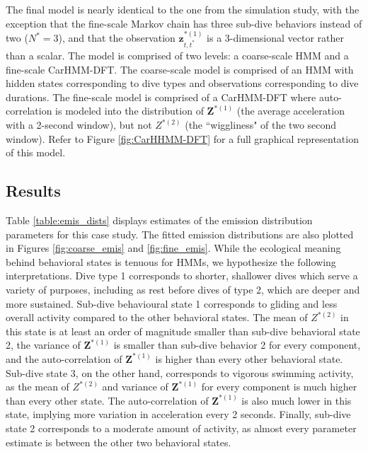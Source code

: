 The final model is nearly identical to the one from the simulation study, with the exception that the fine-scale Markov chain has three sub-dive behaviors instead of two ($N^* = 3$), and that the observation $\mathbf{z}^{*(1)}_{t,t^*}$ is a 3-dimensional vector rather than a scalar. The model is comprised of two levels: a coarse-scale HMM and a fine-scale CarHMM-DFT. The coarse-scale model is comprised of an HMM with hidden states corresponding to dive types and observations corresponding to dive durations. The fine-scale model is comprised of a CarHMM-DFT where auto-correlation is modeled into the distribution of $\mathbf{Z}^{*(1)}$ (the average acceleration with a 2-second window), but not $Z^{*(2)}$ (the ``wiggliness" of the two second window). Refer to Figure \ref{fig:CarHHMM-DFT} for a full graphical representation of this model.

\subsection{Results}

Table \ref{table:emis_dists} displays estimates of the emission distribution parameters for this case study. The fitted emission distributions are also plotted in Figures \ref{fig:coarse_emis} and \ref{fig:fine_emis}. While the ecological meaning behind behavioral states is tenuous for HMMs, we hypothesize the following interpretations. Dive type 1 corresponds to shorter, shallower dives which serve a variety of purposes, including as rest before dives of type 2, which are deeper and more sustained. Sub-dive behavioural state 1 corresponds to gliding and less overall activity compared to the other behavioral states. The mean of $Z^{*(2)}$ in this state is at least an order of magnitude smaller than sub-dive behavioral state 2, the variance of $\mathbf{Z}^{*(1)}$ is smaller than sub-dive behavior 2 for every component, and the auto-correlation of $\mathbf{Z}^{*(1)}$ is higher than every other behavioral state. Sub-dive state 3, on the other hand, corresponds to vigorous swimming activity, as the mean of $Z^{*(2)}$ and variance of $\mathbf{Z}^{*(1)}$ for every component is much higher than every other state. The auto-correlation of $\mathbf{Z}^{*(1)}$ is also much lower in this state, implying more variation in acceleration every 2 seconds. Finally, sub-dive state 2 corresponds to a moderate amount of activity, as almost every parameter estimate is between the other two behavioral states.

